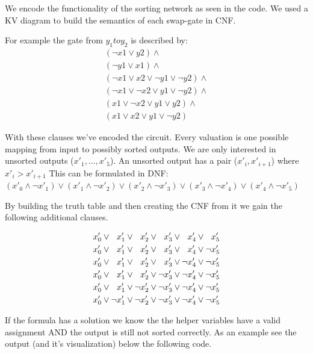 \documentclass{base}
\begin{document}
We encode the functionality of the sorting network as seen in the code.
We used a KV diagram to build the semantics of each swap-gate in CNF.

For example the gate from $y_1 to y_2$ is described by:
\begin{align}
(\neg x1 \lor  y2) \land   \\
(\neg y1 \lor  x1) \land  \\
(\neg x1 \lor  x2 \lor  \neg y1 \lor  \neg y2) \land  \\
(\neg x1 \lor  \neg x2 \lor  y1 \lor  \neg y2) \land  \\
(x1 \lor  \neg x2 \lor  y1 \lor  y2) \land  \\
(x1 \lor  x2 \lor  y1 \lor  \neg y2)
\end{align}



With these clauses we've encoded the circuit. Every valuation is one possible mapping from input to possibly sorted outputs.
We are only interested in unsorted outputs ($x'_1,\dots,x'_5$). An unsorted output has a pair ($x'_i, x'_{i+1}$) where $x'_i > x'_{i+1}$
This can be formulated in DNF: \\
$(x'_0 \land \neg x'_1) \lor (x'_1 \land \neg x'_2) \lor (x'_2 \land \neg x'_3) \lor (x'_3 \land \neg x'_4) \lor (x'_4 \land \neg x'_5)$


By building the truth table and then creating the CNF from it we gain the following additional clauses.

\newcommand{\veg}{\hphantom{\neg}}
\begin{align*}
    x'_0 \lor \veg x'_1 \lor \veg x'_2 \lor \veg x'_3 \lor \veg x'_4 \lor \veg x'_5 \\
    x'_0 \lor \veg x'_1 \lor \veg x'_2 \lor \veg x'_3 \lor \veg x'_4 \lor \neg x'_5 \\
    x'_0 \lor \veg x'_1 \lor \veg x'_2 \lor \veg x'_3 \lor \neg x'_4 \lor \neg x'_5 \\
    x'_0 \lor \veg x'_1 \lor \veg x'_2 \lor \neg x'_3 \lor \neg x'_4 \lor \neg x'_5 \\
    x'_0 \lor \veg x'_1 \lor \neg x'_2 \lor \neg x'_3 \lor \neg x'_4 \lor \neg x'_5 \\
    x'_0 \lor \neg x'_1 \lor \neg x'_2 \lor \neg x'_3 \lor \neg x'_4 \lor \neg x'_5 \\
\end{align*}



If the formula has a solution we know the the helper variables have a valid assignment AND the output is still not sorted correctly.
As an example see the output (and it's visualization) below the following code.
\end{document}
